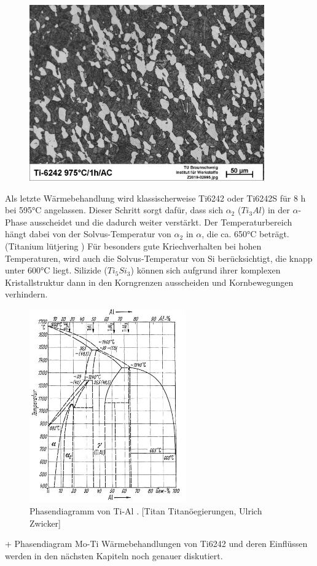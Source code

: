 \begin{figure}[H]
	\centering
	\includegraphics[width=0.9\textwidth]{Bilder/LM-975-1h-AC}
	\caption{}
	\label{L.M}
\end{figure}


Als letzte Wärmebehandlung wird klassischerweise  Ti6242 oder Ti6242S für  8 h bei 595°C angelassen. Dieser Schritt sorgt dafür, dass sich $\alpha_2$ ($Ti_3Al$) in der $\alpha$-Phase ausscheidet und die dadurch weiter verstärkt. Der Temperaturbereich hängt dabei von der Solvus-Temperatur von $\alpha_2$ in $\alpha$, die ca. 650°C beträgt.(Titanium lütjering )
Für besonders gute Kriechverhalten bei hohen Temperaturen, wird auch die Solvus-Temperatur von Si berücksichtigt, die knapp unter 600°C liegt. Silizide ($Ti_5Si_3$) können sich aufgrund ihrer komplexen Kristallstruktur dann in den Korngrenzen ausscheiden und Kornbewegungen verhindern.


\begin{figure}[H]
	\centering
	\includegraphics[width=0.6\textwidth]{Bilder/TiAl}
	\caption{Phasendiagramm von Ti-Al . [Titan Titanöegierungen, Ulrich Zwicker]}
\end{figure}
+ Phasendiagram Mo-Ti
Wärmebehandlungen von Ti6242 und deren Einflüssen werden in den nächsten Kapiteln noch genauer diskutiert.


